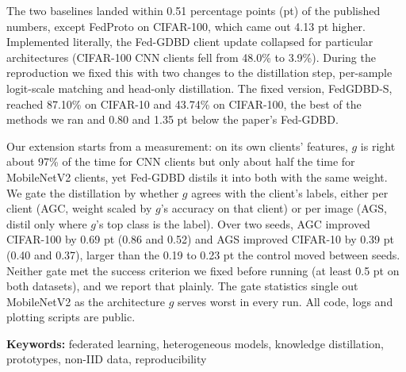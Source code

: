 \documentclass[12pt,a4paper,twoside,openany]{report}
\numberwithin{equation}{chapter}
\begin{document}
The two baselines landed within 0.51 percentage points (pt) of the published numbers, except FedProto on CIFAR-100, which came out 4.13 pt higher. Implemented literally, the Fed-GDBD client update collapsed for particular architectures (CIFAR-100 CNN clients fell from 48.0\% to 3.9\%). During the reproduction we fixed this with two changes to the distillation step, per-sample logit-scale matching and head-only distillation. The fixed version, FedGDBD-S, reached 87.10\% on CIFAR-10 and 43.74\% on CIFAR-100, the best of the methods we ran and 0.80 and 1.35 pt below the paper's Fed-GDBD.

Our extension starts from a measurement: on its own clients' features, $g$ is right about 97\% of the time for CNN clients but only about half the time for MobileNetV2 clients, yet Fed-GDBD distils it into both with the same weight. We gate the distillation by whether $g$ agrees with the client's labels, either per client (AGC, weight scaled by $g$'s accuracy on that client) or per image (AGS, distil only where $g$'s top class is the label). Over two seeds, AGC improved CIFAR-100 by 0.69 pt (0.86 and 0.52) and AGS improved CIFAR-10 by 0.39 pt (0.40 and 0.37), larger than the 0.19 to 0.23 pt the control moved between seeds. Neither gate met the success criterion we fixed before running (at least 0.5 pt on both datasets), and we report that plainly. The gate statistics single out MobileNetV2 as the architecture $g$ serves worst in every run. All code, logs and plotting scripts are public.

\vspace{1em}
\noindent\textbf{Keywords:} federated learning, heterogeneous models, knowledge distillation, prototypes, non-IID data, reproducibility

\clearpage
\tableofcontents
\clearpage
{}
\listoffigures
\clearpage
{}
\listoftables
\clearpage
\end{document}

